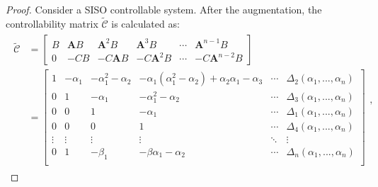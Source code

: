\documentclass[a4paper,11pt]{book}
\numberwithin{figure}{chapter}
\numberwithin{equation}{chapter}
\numberwithin{table}{chapter}
\theoremstyle{definition}
\begin{document}
\begin{proof}
    Consider a SISO controllable system. After the augmentation, the controllability matrix $\tilde{\bm{\mathcal{C}}}$ is calculated as:
    \begin{align}
    \begin{split}
        \tilde{\bm{\mathcal{C}}} &= \begin{bmatrix}
            B & \bm{A} B & \bm{A}^2 B & \bm{A}^3 B & \cdots & \bm{A}^{n-1} B \\
            0 & -C B & -C \bm{A} B & -C \bm{A}^2 B & \cdots & -C \bm{A}^{n-2} B
        \end{bmatrix} \\
        &=
            \begin{bmatrix}
                1 & -\alpha_1 & -\alpha_1^2 - \alpha_2 & -\alpha_1(\alpha_1^2 - \alpha_2) + \alpha_2 \alpha_1 - \alpha_3 & \cdots & \Delta_2(\alpha_1,...,\alpha_n) \\
                0 & 1 & -\alpha_1 & -\alpha_1^2 - \alpha_2  & \cdots & \Delta_3(\alpha_1,...,\alpha_n) \\
                0 & 0 & 1 & -\alpha_1  & \cdots & \Delta_1(\alpha_1,...,\alpha_n) \\
                0 & 0 & 0 & 1 &  \cdots & \Delta_4(\alpha_1,...,\alpha_n) \\
                \vdots & \vdots & \vdots & \vdots & \ddots & \vdots \\
                0 & 1 & -\beta_1 & -\beta\alpha_1 - \alpha_2  & \cdots & \Delta_n(\alpha_1,...,\alpha_n) \\
            \end{bmatrix}
    \end{split}
    ,\end{align}
    

\end{proof}
\end{document}
